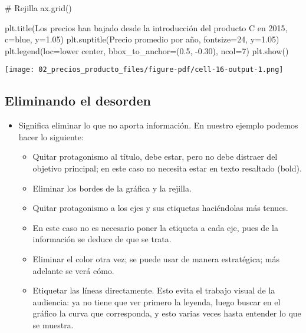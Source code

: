 \documentclass[
  letterpaper,
  DIV=11,
  numbers=noendperiod]{scrreprt}
\newenvironment{Shaded}{\begin{snugshade}}{\end{snugshade}}
\newcommand{\CommentTok}[1]{\textcolor[rgb]{0.37,0.37,0.37}{#1}}
\newcommand{\DecValTok}[1]{\textcolor[rgb]{0.68,0.00,0.00}{#1}}
\newcommand{\FloatTok}[1]{\textcolor[rgb]{0.68,0.00,0.00}{#1}}
\newcommand{\NormalTok}[1]{\textcolor[rgb]{0.00,0.23,0.31}{#1}}
\newcommand{\OperatorTok}[1]{\textcolor[rgb]{0.37,0.37,0.37}{#1}}
\newcommand{\StringTok}[1]{\textcolor[rgb]{0.13,0.47,0.30}{#1}}
\providecommand{\tightlist}{%
  \setlength{\itemsep}{0pt}\setlength{\parskip}{0pt}}\usepackage{longtable,booktabs,array}
\begin{document}
\begin{Shaded}
\begin{Highlighting}[]
\CommentTok{\# Rejilla }
\NormalTok{ax.grid()}

\NormalTok{plt.title(}\StringTok{\textquotesingle{}Los precios han bajado desde la introducción del producto C en 2015\textquotesingle{}}\NormalTok{, c}\OperatorTok{=}\StringTok{\textquotesingle{}blue\textquotesingle{}}\NormalTok{, y}\OperatorTok{=}\FloatTok{1.05}\NormalTok{)}
\NormalTok{plt.suptitle(}\StringTok{\textquotesingle{}Precio promedio por año\textquotesingle{}}\NormalTok{, fontsize}\OperatorTok{=}\DecValTok{24}\NormalTok{, y}\OperatorTok{=}\FloatTok{1.05}\NormalTok{)}
\NormalTok{plt.legend(loc}\OperatorTok{=}\StringTok{\textquotesingle{}lower center\textquotesingle{}}\NormalTok{, bbox\_to\_anchor}\OperatorTok{=}\NormalTok{(}\FloatTok{0.5}\NormalTok{, }\OperatorTok{{-}}\FloatTok{0.30}\NormalTok{), ncol}\OperatorTok{=}\DecValTok{7}\NormalTok{)}
\NormalTok{plt.show()}
\end{Highlighting}
\end{Shaded}

\texttt{[image: 02\_precios\_producto\_files/figure-pdf/cell-16-output-1.png]}

\subsection{Eliminando el desorden}\label{eliminando-el-desorden}

\begin{itemize}
\tightlist
\item
  Significa eliminar lo que no aporta información. En nuestro ejemplo
  podemos hacer lo siguiente:

  \begin{itemize}
  \tightlist
  \item
    Quitar protagonismo al título, debe estar, pero no debe distraer del
    objetivo principal; en este caso no necesita estar en texto
    resaltado (bold).
  \item
    Eliminar los bordes de la gráfica y la rejilla.
  \item
    Quitar protagonismo a los ejes y sus etiquetas haciéndolas más
    tenues.
  \item
    En este caso no es necesario poner la etiqueta a cada eje, pues de
    la información se deduce de que se trata.
  \item
    Eliminar el color otra vez; se puede usar de manera estratégica; más
    adelante se verá cómo.
  \item
    Etiquetar las líneas directamente. Esto evita el trabajo visual de
    la audiencia: ya no tiene que ver primero la leyenda, luego buscar
    en el gráfico la curva que corresponda, y esto varias veces hasta
    entender lo que se muestra.
  \end{itemize}
\end{itemize}
\end{document}
